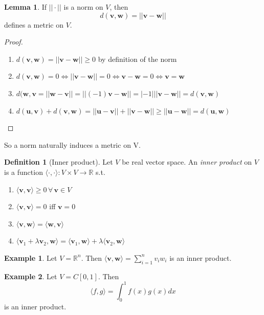 \documentclass[a4paper,11pt]{article}
\theoremstyle{definition}
\newtheorem*{defn}{Definition}
\newtheorem*{ex}{Example}
\newtheorem*{lem}{Lemma}
\numberwithin{equation}{section}
\begin{document}
\begin{lem}
If $||\cdot||$ is a norm on $V$, then 
\begin{equation}
    d(\mathbf{v},\mathbf{w})=||\mathbf{v}-\mathbf{w}||
\end{equation}
defines a metric on $V$.
\end{lem}
\begin{proof}
\leavevmode
\begin{enumerate}
    \item $d(\mathbf{v},\mathbf{w})=||\mathbf{v}-\mathbf{w}||\geq0$ by definition of the norm
    \item $d(\mathbf{v},\mathbf{w})=0\Leftrightarrow||\mathbf{v}-\mathbf{w}||=0\Leftrightarrow \mathbf{v}-\mathbf{w}=0 \Leftrightarrow \mathbf{v}=\mathbf{w}$
    \item $d(\mathbf{w},\mathbf{v}=||\mathbf{w}-\mathbf{v}|| = ||(-1)\mathbf{v}-\mathbf{w}|| = |-1|||\mathbf{v}-\mathbf{w}||=d(\mathbf{v},\mathbf{w})$
    \item $d(\mathbf{u},\mathbf{v})+d(\mathbf{v},\mathbf{w})=||\mathbf{u}-\mathbf{v}||+||\mathbf{v}-\mathbf{w}||\geq||\mathbf{u}-\mathbf{w}||=d(\mathbf{u},\mathbf{w})$
\end{enumerate}
\end{proof}
So a norm naturally induces a metric on V.

\begin{defn}[Inner product]
Let $V$ be real vector space. An \emph{inner product} on $V$ is a function $\langle\cdot,\cdot\rangle:V\times V\rightarrow\mathbb{R}$ s.t.
\begin{enumerate}
    \item $\langle\mathbf{v},\mathbf{v}\rangle\geq0\,\forall\,\mathbf{v}\in V$
    \item $\langle\mathbf{v},\mathbf{v}\rangle=0$ iff $\mathbf{v}=0$
    \item $\langle\mathbf{v},\mathbf{w}\rangle=\langle\mathbf{w},\mathbf{v}\rangle$
    \item $\langle\mathbf{v}_1+\lambda\mathbf{v}_2,\mathbf{w}\rangle=\langle \mathbf{v}_1,\mathbf{w}\rangle+\lambda\langle\mathbf{v}_2,\mathbf{w}\rangle$
\end{enumerate}
\end{defn}

\begin{ex}
Let $V=\mathbb{R}^n$. Then $\langle\mathbf{v},\mathbf{w}\rangle = \sum_{i=1}^n v_iw_i$ is an inner product.
\end{ex}

\begin{ex}
Let $V=C[0,1]$. Then 
\begin{equation}
    \langle f,g\rangle=\int_0^1f(x)g(x)dx
\end{equation}
is an inner product.
\end{ex}
\end{document}
